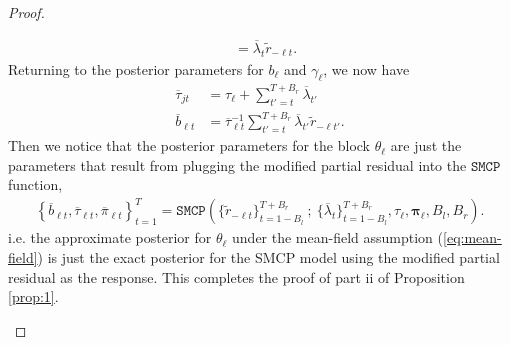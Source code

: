 \begin{proof}
\begin{enumerate}[label=\roman*.]
\begin{align*}
    &=  \overline{\lambda}_{t} \tilde{r}_{-\ell t}.
\end{align*}
Returning to the posterior parameters for $b_{\ell}$ and $\gamma_{\ell}$, we now have 
\begin{align*}
    \overline{\tau}_{jt} &=  \tau_{\ell} +  \sum_{t'=t}^{T+B_r} \overline{\lambda}_{t'} \\
    \overline{b}_{\ell t}  &= \overline{\tau}_{\ell t}^{-1}  \sum_{t'=t}^{T+B_r} \overline{\lambda}_{t'}\tilde{r}_{-\ell t'}.
\end{align*}
Then we notice that the posterior parameters for the block $\theta_\ell$ are just the parameters that result from plugging the modified partial residual into the $\texttt{SMCP}$ function,
\small
\begin{align*}
    \left\{\overline{b}_{\ell t}, \overline{\tau}_{\ell t}, \overline{\pi}_{\ell t}\right\}_{t=1}^T = \texttt{SMCP}\left(\{\tilde{r}_{-\ell t}\}_{t=1-B_l}^{T+B_r} \:;\: \{\overline{\lambda}_t\}_{t=1-B_l}^{T+B_r}, \tau_{\ell}, \pmb{\pi}_{\ell}, B_l,B_r\right).
\end{align*}
\normalsize
i.e. the approximate posterior for $\theta_\ell$ under the mean-field assumption (\ref{eq:mean-field}) is just the exact posterior for the SMCP model using the modified partial residual as the response. This completes the proof of part ii of Proposition \ref{prop:1}.


\end{enumerate}
\end{proof}
